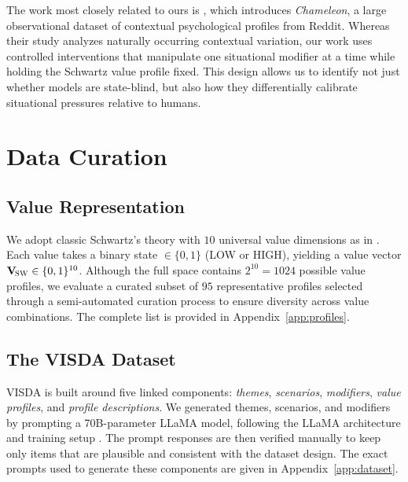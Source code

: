 \documentclass[11pt]{article}
\newcommand{\Vsw}{\mathbf{V}_{\!\textsc{SW}}}
\begin{document}
The work most closely related to ours is \citet{harry2026beyond}, which introduces \emph{Chameleon}, a large observational dataset of contextual psychological profiles from Reddit. Whereas their study analyzes naturally occurring contextual variation, our work uses controlled interventions that manipulate one situational modifier at a time while holding the Schwartz value profile fixed. This design allows us to identify not just whether models are state-blind, but also how they differentially calibrate situational pressures relative to humans.

\section{Data Curation}
\label{sec:method}


\subsection{Value Representation}
\label{sec:value-rep}

We adopt classic Schwartz's theory with $10$ universal value dimensions as in \citep{schwartz1992universals}. Each value takes a binary state $\in \{0,1\}$ (LOW or HIGH), yielding a value vector $\Vsw \in \{0,1\}^{10}$. Although the full space contains \(2^{10} = 1024\) possible value profiles, we evaluate a curated subset of $95$ representative profiles selected through a semi-automated curation process to ensure diversity across value combinations. The complete list is provided in Appendix~\ref{app:profiles}.

\subsection{The VISDA Dataset}
\label{sec:dataset}

VISDA is built around five linked components: \emph{themes}, \emph{scenarios}, \emph{modifiers}, \emph{value profiles}, and \emph{profile descriptions}.
We generated themes, scenarios, and modifiers by prompting a 70B-parameter LLaMA model, following the LLaMA architecture and training setup \citep{touvron2023llama}. The prompt responses are then verified manually to keep only items that are plausible and consistent with the dataset design.
The exact prompts used to generate these components are given in Appendix~\ref{app:dataset}.
\end{document}
